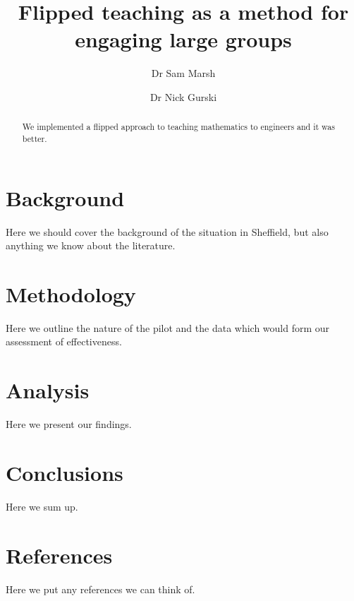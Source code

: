 \documentclass{amsart}
\title{Flipped teaching as a method for engaging large groups}
\author{Dr Sam Marsh}
\author{Dr Nick Gurski}
\begin{document}
\maketitle

\begin{abstract}
We implemented a flipped approach to teaching mathematics to engineers and it was better.
\end{abstract}

\section{Background}
Here we should cover the background of the situation in Sheffield, but also anything we know about the literature.

\section{Methodology}
Here we outline the nature of the pilot and the data which would form our assessment of effectiveness.

\section{Analysis}
Here we present our findings.

\section{Conclusions}
Here we sum up.

\section{References}
Here we put any references we can think of.
\end{document}
